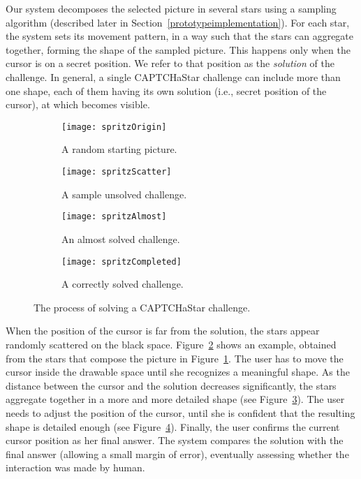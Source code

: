 \documentclass[conference]{IEEEtran}
\begin{document}
Our system decomposes the selected picture in several stars using a sampling algorithm (described later in Section~\ref{prototypeimplementation}).
For each star, the system sets its movement pattern, in a way such that the stars can aggregate together, forming the shape of the sampled picture. This happens only when the cursor is on a secret position.
We refer to that position as the \textit{solution} of the challenge.
In general, a single CAPTCHaStar challenge can include more than one shape, each of them having its own solution (i.e., secret position of the cursor), at which becomes visible. 

\begin{figure*}[ht!]
\centering
\begin{subfigure}{.24\textwidth}
 \centering
\texttt{[image: spritzOrigin]}
\caption{A random starting picture.}
\label{fig:originSpritz}
\end{subfigure}
\begin{subfigure}{.24\textwidth}
  \centering
  \texttt{[image: spritzScatter]}
  \caption{A sample unsolved challenge.}
\label{fig:unsolvedSpritz}
\end{subfigure}
\begin{subfigure}{.24\textwidth}
  \centering
  \texttt{[image: spritzAlmost]}
  \caption{An almost solved challenge.}
\label{fig:almostSpritz}
\end{subfigure}
\begin{subfigure}{.24\textwidth}
  \centering
  \texttt{[image: spritzCompleted]}
 \caption{A correctly solved challenge.}
\label{fig:solvedSpritz}
\end{subfigure}
\vspace{-0.0cm}
\caption{The process of solving a CAPTCHaStar challenge.}
\label{fig:test}
\end{figure*}



When the position of the cursor is far from the solution, the stars appear randomly scattered on the black space.
Figure~\ref{fig:unsolvedSpritz} shows an example, obtained from the stars that compose the picture in Figure~\ref{fig:originSpritz}.
The user has to move the cursor inside the drawable space until she recognizes a meaningful shape.
As the distance between the cursor and the solution decreases significantly, the stars aggregate together
in a more and more detailed shape
(see Figure~\ref{fig:almostSpritz}).
The user needs to adjust the position of the cursor, until she is confident that the resulting shape is detailed enough (see Figure~\ref{fig:solvedSpritz}).
Finally, the user confirms the current cursor position as her final answer.
The system compares the solution with the final answer (allowing a small margin of error), eventually assessing whether the interaction was made by human.
\end{document}
